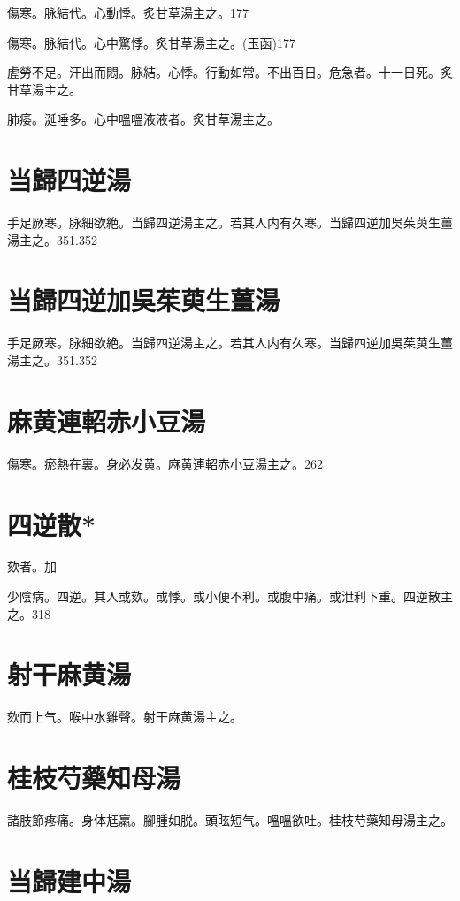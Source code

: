 \documentclass[b5paper,twoside,zihao=-4,UTF8]{ctexbook}
\begin{document}
傷寒。脉結代。心動悸。炙甘草湯主之。177

傷寒。脉結代。心中驚悸。炙甘草湯主之。(玉函)177

虗勞不足。汗出而悶。脉結。心悸。行動如常。不出百日。危急者。十一日死。炙甘草湯主之。

肺痿。涎唾多。心中嗢嗢液液者。炙甘草湯主之。

\section{当歸四逆湯}

手足厥寒。脉細欲絶。当歸四逆湯主之。若其人内有久寒。当歸四逆加吳茱萸生薑湯主之。351.352

\section{当歸四逆加吳茱萸生薑湯}

手足厥寒。脉細欲絶。当歸四逆湯主之。若其人内有久寒。当歸四逆加吳茱萸生薑湯主之。351.352

\section{麻黄連軺赤小豆湯}

傷寒。瘀熱在裏。身必发黄。麻黄連軺赤小豆湯主之。262

\section{四逆散*}

欬者。加

少陰病。四逆。其人或欬。或悸。或小便不利。或腹中痛。或泄利下重。四逆散主之。318

\section{射干麻黄湯}

欬而上气。喉中水雞聲。射干麻黄湯主之。

\section{桂枝芍藥知母湯}

諸肢節疼痛。身体尪羸。腳腫如脱。頭眩短气。嗢嗢欲吐。桂枝芍藥知母湯主之。

\section{当歸建中湯}
\end{document}
